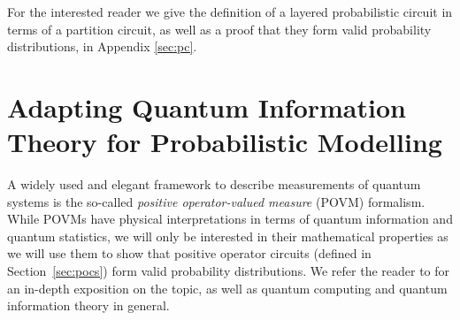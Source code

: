 For the interested reader we give the definition of a layered probabilistic circuit in terms of a partition
circuit, as well as a proof that they form valid probability distributions, in Appendix \ref{sec:pc}.








\section{Adapting Quantum Information Theory for Probabilistic Modelling}
\label{sec:qit}


A widely used and elegant framework to describe measurements of quantum systems is the so-called \textit{positive operator-valued measure} (POVM) formalism. While POVMs have physical interpretations in terms of quantum information and quantum statistics, we will only be interested in their mathematical properties as we will use them to show that positive operator circuits (defined in Section~\ref{sec:pocs}) form valid probability distributions.
We refer the reader to \citep{nielsen2001quantum} for an in-depth exposition on the topic, as well as quantum computing and quantum information theory in general.

